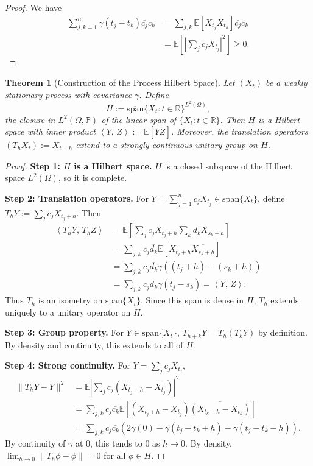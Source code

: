 \documentclass[11pt]{article}
\newtheorem{theorem}{Theorem}[section]
\theoremstyle{definition}
\theoremstyle{remark}
\newcommand{\R}{\mathbb{R}}
\newcommand{\E}{\mathbb{E}}
\newcommand{\Prob}{\mathbb{P}}
\newcommand{\1}{\mathbbm{1}}
\newcommand{\ip}[2]{\left\langle #1,\,#2 \right\rangle}
\begin{document}
\begin{proof}
We have
\begin{align*}
\sum_{j,k=1}^n\gamma(t_j-t_k)\overline{c_j}c_k&=\sum_{j,k}\E[X_{t_j}\overline{X_{t_k}}]\overline{c_j}c_k\\
&=\E\left[\left|\sum_j c_jX_{t_j}\right|^2\right]\geq 0.
\end{align*}
\end{proof}

\begin{theorem}[Construction of the Process Hilbert Space]\label{thm:process_hilbert}
Let $(X_t)$ be a weakly stationary process with covariance $\gamma$. Define
\[
H:=\overline{\text{span}}\{X_t:t\in\R\}^{L^2(\Omega)},
\]
the closure in $L^2(\Omega,\Prob)$ of the linear span of $\{X_t:t\in\R\}$. Then $H$ is a Hilbert space with inner product $\ip{Y}{Z}:=\E[Y\overline{Z}]$. Moreover, the translation operators $(T_hX_t):=X_{t+h}$ extend to a strongly continuous unitary group on $H$.
\end{theorem}

\begin{proof}
\textbf{Step 1: $H$ is a Hilbert space.}
$H$ is a closed subspace of the Hilbert space $L^2(\Omega)$, so it is complete.

\textbf{Step 2: Translation operators.}
For $Y=\sum_{j=1}^nc_jX_{t_j}\in\text{span}\{X_t\}$, define $T_hY:=\sum_jc_jX_{t_j+h}$. Then
\begin{align*}
\ip{T_hY}{T_hZ}&=\E\left[\sum_j c_jX_{t_j+h}\overline{\sum_k d_kX_{s_k+h}}\right]\\
&=\sum_{j,k}c_j\overline{d_k}\E[X_{t_j+h}\overline{X_{s_k+h}}]\\
&=\sum_{j,k}c_j\overline{d_k}\gamma((t_j+h)-(s_k+h))\\
&=\sum_{j,k}c_j\overline{d_k}\gamma(t_j-s_k)=\ip{Y}{Z}.
\end{align*}
Thus $T_h$ is an isometry on $\text{span}\{X_t\}$. Since this span is dense in $H$, $T_h$ extends uniquely to a unitary operator on $H$.

\textbf{Step 3: Group property.}
For $Y\in\text{span}\{X_t\}$, $T_{h+k}Y=T_h(T_kY)$ by definition. By density and continuity, this extends to all of $H$.

\textbf{Step 4: Strong continuity.}
For $Y=\sum_jc_jX_{t_j}$,
\begin{align*}
\|T_hY-Y\|^2&=\E\left|\sum_jc_j(X_{t_j+h}-X_{t_j})\right|^2\\
&=\sum_{j,k}c_j\overline{c_k}\E[(X_{t_j+h}-X_{t_j})\overline{(X_{t_k+h}-X_{t_k})}]\\
&=\sum_{j,k}c_j\overline{c_k}(2\gamma(0)-\gamma(t_j-t_k+h)-\gamma(t_j-t_k-h)).
\end{align*}
By continuity of $\gamma$ at 0, this tends to 0 as $h\to 0$. By density, $\lim_{h\to 0}\|T_h\phi-\phi\|=0$ for all $\phi\in H$.
\end{proof}
\end{document}
